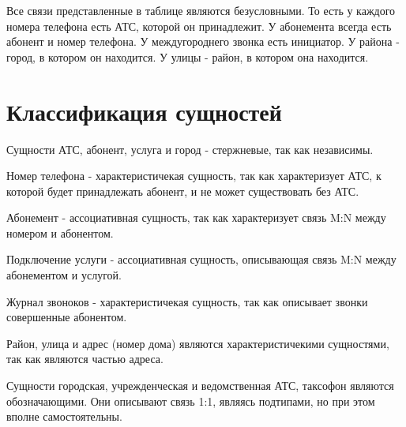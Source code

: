 \documentclass{report}
\begin{document}
Все связи представленные в таблице являются безусловными. То есть у каждого 
номера телефона есть АТС, которой он принадлежит. У абонемента всегда
есть абонент и номер телефона. У междугороднего звонка есть инициатор. 
У района - город, в котором он находится. У улицы - район, в котором она 
находится.

\section{Классификация сущностей}

Сущности АТС, абонент, услуга и город - стержневые, так как независимы. 

Номер телефона - характеристичекая сущность, 
так как характеризует АТС, к которой будет принадлежать абонент, и не может
существовать без АТС.

Абонемент - ассоциативная сущность, так как характеризует связь M:N между номером и абонентом.

Подключение услуги - ассоциативная сущность, описывающая связь M:N между 
абонементом и услугой.

Журнал звоноков - характеристичекая сущность, так как 
описывает звонки совершенные абонентом.

Район, улица и адрес (номер дома) являются характеристичекими сущностями, 
так как являются частью адреса.

Сущности городская, учрежденческая и ведомственная АТС, таксофон являются
обозначающими. Они описывают связь 1:1, являясь подтипами, но при 
этом вполне самостоятельны. 
\end{document}
